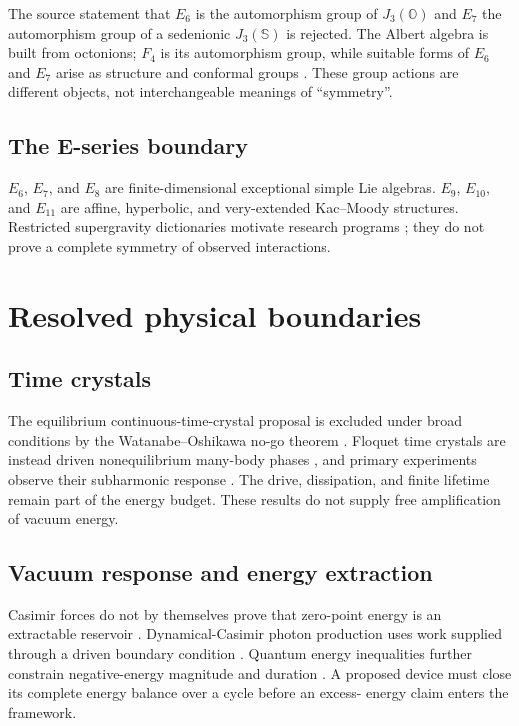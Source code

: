 The source statement that $E_6$ is the automorphism group of
$J_3(\mathbb{O})$ and $E_7$ the automorphism group of a sedenionic
$J_3(\mathbb{S})$ is rejected. The Albert algebra is built from octonions;
$F_4$ is its automorphism group, while suitable forms of $E_6$ and $E_7$ arise
as structure and conformal groups \citep{baez2001octonions}. These group
actions are different objects,
not interchangeable meanings of \enquote{symmetry}.

\subsection{The E-series boundary}

$E_6$, $E_7$, and $E_8$ are finite-dimensional exceptional simple Lie
algebras. $E_9$, $E_{10}$, and $E_{11}$ are affine, hyperbolic, and
very-extended Kac--Moody structures. Restricted supergravity dictionaries
motivate research programs \citep{damour2002e10,west2001e11}; they do not prove
a complete symmetry of observed interactions.

\section{Resolved physical boundaries}

\subsection{Time crystals}

The equilibrium continuous-time-crystal proposal is excluded under broad
conditions by the Watanabe--Oshikawa no-go theorem
\citep{watanabe2015absence}. Floquet time crystals are instead driven
nonequilibrium many-body phases \citep{else2016floquet}, and primary experiments
observe their subharmonic response \citep{zhang2017observation}. The drive,
dissipation, and finite lifetime remain part of the energy budget. These results
do not supply free amplification of vacuum energy.

\subsection{Vacuum response and energy extraction}

Casimir forces do not by themselves prove that zero-point energy is an
extractable reservoir \citep{jaffe2005casimir}. Dynamical-Casimir photon
production uses work supplied through a driven boundary condition
\citep{wilson2011observation}. Quantum energy inequalities further constrain
negative-energy magnitude and duration \citep{fewster2012lectures}. A proposed
device must close its complete energy balance over a cycle before an excess-
energy claim enters the framework.

